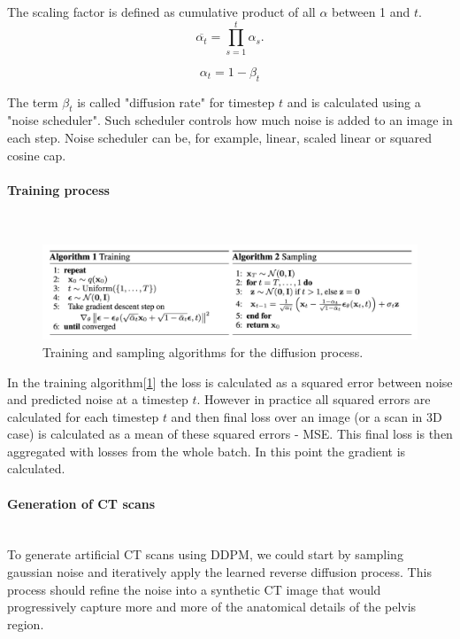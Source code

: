 The scaling factor is defined as cumulative product of all $\alpha$ between 1 and $t$. 
\begin{equation}
    \overline{\alpha_t} = \prod_{s=1}^t \alpha_s.
\end{equation}

\begin{equation}
    \alpha_t = 1-\beta_t
\end{equation}

The term $\beta_t$ is called "diffusion rate" for timestep $t$ and is calculated using a "noise scheduler". Such scheduler controls how much noise is added to an image in each step. Noise scheduler can be, for example, linear, scaled linear or squared cosine cap.

\paragraph{Training process}\mbox{}\\

\begin{figure}[H]
    \centering
    \includegraphics[width=0.9\linewidth]{concept_engineering/ddpm/DDPM-algo.png}
    \caption{Training and sampling algorithms for the diffusion process\cite{ho2020denoisingdiffusionprobabilisticmodels}.}
    \label{fig:diffusion-algo}
\end{figure}
In the training algorithm[\ref{fig:diffusion-algo}] the loss is calculated as a squared error between noise and predicted noise at a timestep $t$. However in practice all squared errors are calculated for each timestep $t$ and then final loss over an image (or a scan in 3D case) is calculated as a mean of these squared errors - MSE. 
This final loss is then aggregated with losses from the whole batch. In this point the gradient is calculated.  

\paragraph{Generation of CT scans}\mbox{}\\
\indent To generate artificial CT scans using DDPM, we could start by sampling gaussian noise and iteratively apply the learned reverse diffusion process. This process should refine the noise into a synthetic CT image that would progressively capture more and more of the anatomical details of the pelvis region.


